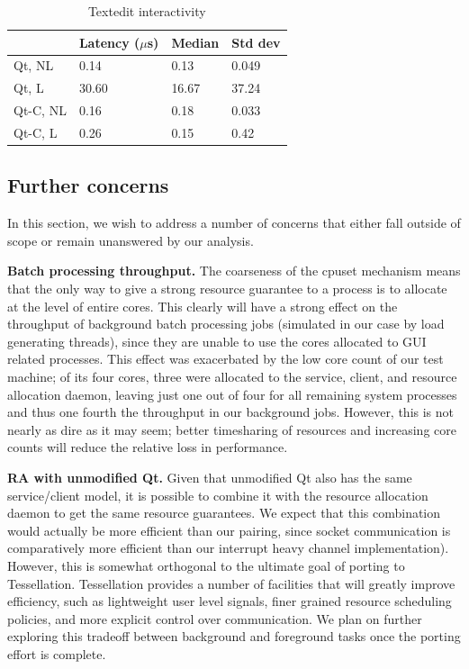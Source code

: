\documentclass[letterpaper,twocolumn,10pt]{article}
\begin{document}
\begin{table}[htp]
\caption{Textedit interactivity}
\label{tab:textedit_table}
\centering
\begin{tabular}{|l | l | l | l |}
\hline
	&Latency ($\mu$s)	&Median	&Std dev\\ \hline
Qt, NL	&0.14	&0.13	&0.049\\
Qt, L	&30.60	&16.67	&37.24\\
Qt-C, NL	&0.16	&0.18	&0.033\\
Qt-C, L	&0.26	&0.15	&0.42\\
\hline
\end{tabular}
\end{table}

\subsection{Further concerns}

In this section, we wish to address a number of concerns that either fall outside of scope or remain unanswered by our analysis.

\textbf{Batch processing throughput.} The coarseness of the cpuset mechanism means that the only way to give a strong resource guarantee to a process is to allocate at the level of entire cores. This clearly will have a strong effect on the throughput of background batch processing jobs (simulated in our case by load generating threads), since they are unable to use the cores allocated to GUI related processes. This effect was exacerbated by the low core count of our test machine; of its four cores, three were allocated to the service, client, and resource allocation daemon, leaving just one out of four for all remaining system processes and thus one fourth the throughput in our background jobs. However, this is not nearly as dire as it may seem; better timesharing of resources and increasing core counts will reduce the relative loss in performance.

\textbf{RA with unmodified Qt.} Given that unmodified Qt also has the same service/client model, it is possible to combine it with the resource allocation daemon to get the same resource guarantees. We expect that this combination would actually be more efficient than our pairing, since socket communication is comparatively more efficient than our interrupt heavy channel implementation). However, this is somewhat orthogonal to the ultimate goal of porting to Tessellation. Tessellation provides a number of facilities that will greatly improve efficiency, such as lightweight user level signals, finer grained resource scheduling policies, and more explicit control over communication. We plan on further exploring this tradeoff between background and foreground tasks once the porting effort is complete.
\end{document}
